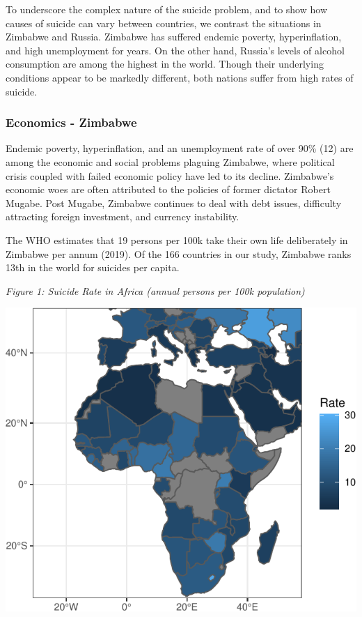 \documentclass[]{article}
\begin{document}
To underscore the complex nature of the suicide problem, and to show how
causes of suicide can vary between countries, we contrast the situations
in Zimbabwe and Russia. Zimbabwe has suffered endemic poverty,
hyperinflation, and high unemployment for years. On the other hand,
Russia's levels of alcohol consumption are among the highest in the
world. Though their underlying conditions appear to be markedly
different, both nations suffer from high rates of suicide.

\subsubsection{Economics - Zimbabwe}\label{economics---zimbabwe}

Endemic poverty, hyperinflation, and an unemployment rate of over 90\%
(12) are among the economic and social problems plaguing Zimbabwe, where
political crisis coupled with failed economic policy have led to its
decline. Zimbabwe's economic woes are often attributed to the policies
of former dictator Robert Mugabe. Post Mugabe, Zimbabwe continues to
deal with debt issues, difficulty attracting foreign investment, and
currency instability.

The WHO estimates that 19 persons per 100k take their own life
deliberately in Zimbabwe per annum (2019). Of the 166 countries in our
study, Zimbabwe ranks 13th in the world for suicides per capita.

\emph{Figure 1: Suicide Rate in Africa (annual persons per 100k
population)}

\begin{center}\includegraphics{Project_Report_files/figure-latex/africa_map_plot-1} \end{center}
\end{document}
